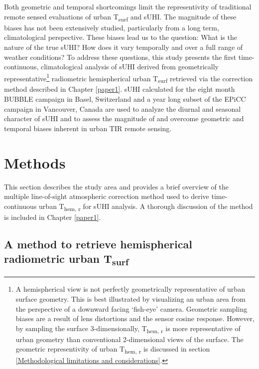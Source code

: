 \begin{bibunit}
Both geometric and temporal shortcomings limit the representivity of traditional remote sensed evaluations of urban T\textsubscript{surf} and sUHI. The magnitude of these biases has not been extensively studied, particularly from a long term, climatological perspective. These biases lead us to the question: What is the nature of the true sUHI? How does it vary temporally and over a full range of weather conditions? To address these questions, this study presents the first time-continuous, climatological analysis of sUHI derived from geometrically representative\footnote{A hemispherical view is not perfectly geometrically representative of urban surface geometry. This is best illustrated by visualizing an urban area from the perspective of a downward facing ‘fish-eye’ camera. Geometric sampling biases are a result of lens distortions and the sensor cosine response. However, by sampling the surface 3-dimensionally, T\textsubscript{hem, r} is more representative of urban geometry than conventional 2-dimensional views of the surface. The geometric representivity of urban T\textsubscript{hem, r} is discussed in section \ref{Methodological limitations and considerations}.} radiometric hemispherical urban T\textsubscript{surf} retrieved via the correction method described in Chapter \ref{paper1}. sUHI calculated for the eight month BUBBLE campaign in Basel, Switzerland and a year long subset of the EPiCC campaign in Vancouver, Canada are used to analyze the diurnal and seasonal character of sUHI and to assess the magnitude of and overcome geometric and temporal biases inherent in urban TIR remote sensing.

\section{Methods}

This section describes the study area and provides a brief overview of the multiple line-of-sight atmospheric correction method used to derive time-continuous urban T\textsubscript{hem, r} for sUHI analysis. A thorough discussion of the method is included in Chapter \ref{paper1}.

\subsection{A method to retrieve hemispherical radiometric urban T\textsubscript{surf}}
\label{method2}


\end{bibunit}
